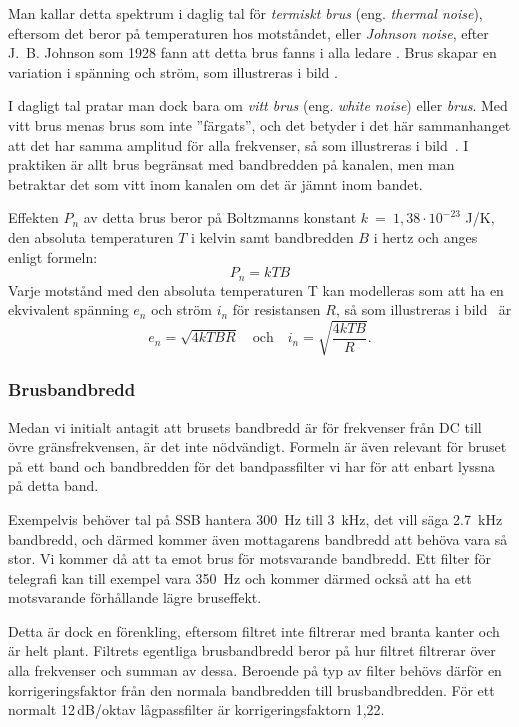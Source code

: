Man kallar detta spektrum i daglig tal för \emph{termiskt brus}
(eng. \emph{thermal noise}), eftersom det beror på temperaturen hos motståndet,
eller \emph{Johnson noise}, efter J.~B. Johnson som 1928 fann att detta brus
fanns i alla ledare \cite{ott1988}.
Brus skapar en variation i spänning och ström, som illustreras i bild
.

I dagligt tal pratar man dock bara om \emph{vitt brus} (eng.
\emph{white noise}) eller \emph{brus}.
Med vitt brus menas brus som inte ''färgats'', och det betyder i det här
sammanhanget att det har samma amplitud för alla frekvenser, så som illustreras
i bild~.
I praktiken är allt brus begränsat med bandbredden på kanalen, men man
betraktar det som vitt inom kanalen om det är jämnt inom bandet.

Effekten \(P_n\) av detta brus beror på Boltzmanns konstant
\(k\ =\ 1,38 \cdot 10^{-23}\) J/K, den absoluta temperaturen \(T\) i
kelvin samt bandbredden \(B\) i hertz och anges enligt formeln:
\[P_n = k T B\]
Varje motstånd med den absoluta temperaturen T kan modelleras som att ha en
ekvivalent spänning \(e_n\) och ström \(i_n\) för resistansen \(R\),
så som illustreras i bild~ är
\[e_n = \sqrt{4kTBR}\quad\text{och}\quad i_n = \sqrt{\dfrac{4kTB}{R}}.\]
\subsubsection{Brusbandbredd}

Medan vi initialt antagit att brusets bandbredd är för frekvenser
från DC till övre gränsfrekvensen, är det inte nödvändigt.
Formeln är även relevant för bruset på ett band och bandbredden för det
bandpassfilter vi har för att enbart lyssna på detta band.

Exempelvis behöver tal på SSB hantera \qty{300}{\hertz} till
\qty{3}{\kilo\hertz}, det vill säga \qty{2,7}{\kilo\hertz} bandbredd, och därmed
kommer även mottagarens bandbredd att behöva vara så stor.
Vi kommer då att ta emot brus för motsvarande bandbredd.
Ett filter för telegrafi kan till exempel vara \qty{350}{\hertz} och kommer
därmed också att ha ett motsvarande förhållande lägre bruseffekt.

Detta är dock en förenkling, eftersom filtret inte filtrerar med branta kanter
och är helt plant.
Filtrets egentliga brusbandbredd beror på hur filtret filtrerar över
alla frekvenser och summan av dessa.
Beroende på typ av filter behövs därför en korrigeringsfaktor
från den normala bandbredden till brusbandbredden.
För ett normalt 12\,dB/oktav lågpassfilter är korrigeringsfaktorn 1,22.
